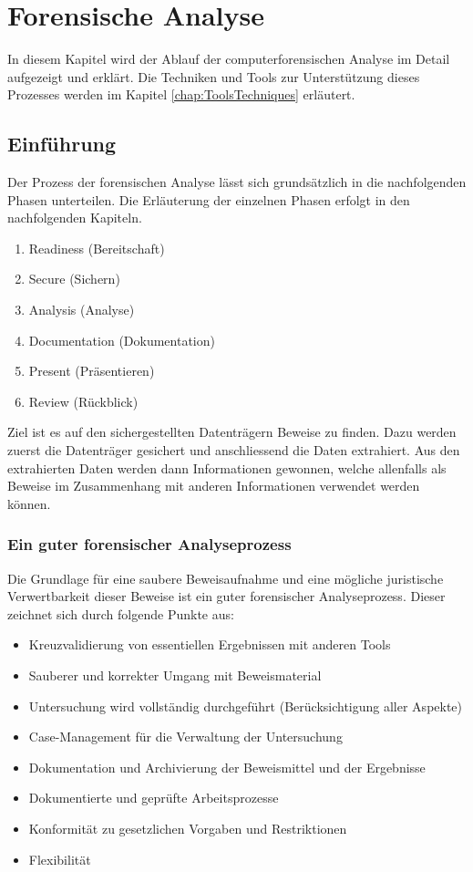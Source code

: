 \chapter{Forensische Analyse} \label{chap:ForensischeAnalyse}
In diesem Kapitel wird der Ablauf der computerforensischen Analyse im Detail aufgezeigt und erklärt. Die Techniken und Tools zur Unterstützung dieses Prozesses werden im Kapitel \ref{chap:ToolsTechniques}  erläutert.

\section{Einführung}
Der Prozess der forensischen Analyse lässt sich grundsätzlich in die nachfolgenden Phasen unterteilen. Die Erläuterung der einzelnen Phasen erfolgt in den nachfolgenden Kapiteln.

\begin{enumerate}	
\item Readiness (Bereitschaft)
\item Secure (Sichern)
\item Analysis (Analyse)
\item Documentation (Dokumentation)
\item Present (Präsentieren)
\item Review (Rückblick)
\end{enumerate}

Ziel ist es auf den sichergestellten Datenträgern Beweise zu finden. Dazu werden zuerst die Datenträger gesichert und anschliessend die Daten extrahiert. Aus den extrahierten Daten werden dann Informationen gewonnen, welche allenfalls als Beweise im Zusammenhang mit anderen Informationen verwendet werden können.
 

\subsection{Ein guter forensischer Analyseprozess}
Die Grundlage für eine saubere Beweisaufnahme und eine mögliche juristische Verwertbarkeit dieser Beweise ist ein guter forensischer Analyseprozess. Dieser zeichnet sich durch folgende Punkte aus:

\begin{itemize}
\item Kreuzvalidierung von essentiellen Ergebnissen mit anderen Tools
\item Sauberer und korrekter Umgang mit Beweismaterial
\item Untersuchung wird vollständig durchgeführt (Berücksichtigung aller Aspekte)
\item Case-Management für die Verwaltung der Untersuchung
\item Dokumentation und Archivierung der Beweismittel und der Ergebnisse
\item Dokumentierte und geprüfte Arbeitsprozesse
\item Konformität zu gesetzlichen Vorgaben und Restriktionen
\item Flexibilität
\end{itemize}

